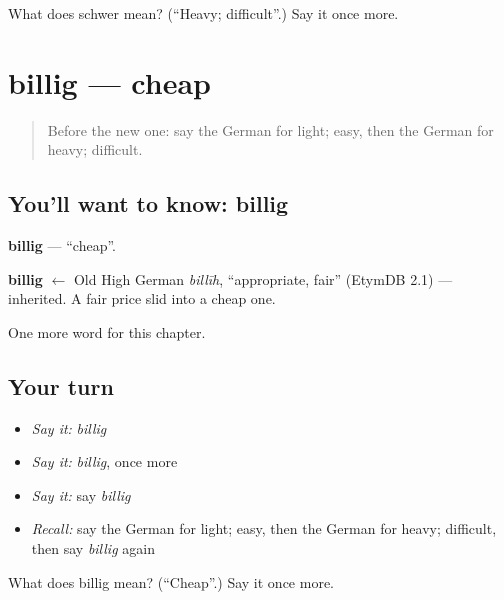 \begin{tcolorbox}[breakable,colback=teal!4,colframe=teal!35!black,title={Before you move on}]
What does schwer mean? (\textquotedblleft{}Heavy; difficult\textquotedblright{}.) Say it once more.
\end{tcolorbox}
\section[billig]{billig — cheap}

\label{lesson:GE-C90-billig}



\begin{quote}
Before the new one: say the German for light; easy, then the German for heavy; difficult.
\end{quote}

\subsection*{You'll want to know: billig}
\textbf{billig} — \textquotedblleft{}cheap\textquotedblright{}.

\begin{cousinweb}
\textbf{billig} $\leftarrow$ Old High German \emph{billīh}, \textquotedblleft{}appropriate, fair\textquotedblright{} (EtymDB 2.1) — inherited. A fair price slid into a cheap one.
\end{cousinweb}

\begin{grammarlens}[title={What you've built}]
One more word for this chapter.
\end{grammarlens}

\subsection*{Your turn}
\begin{itemize}
\raggedright
  \item \emph{Say it:} \emph{billig}
  \item \emph{Say it:} \emph{billig}, once more
  \item \emph{Say it:} say \emph{billig}
  \item \emph{Recall:} say the German for light; easy, then the German for heavy; difficult, then say \emph{billig} again
\end{itemize}

\begin{tcolorbox}[breakable,colback=teal!4,colframe=teal!35!black,title={Before you move on}]
What does billig mean? (\textquotedblleft{}Cheap\textquotedblright{}.) Say it once more.
\end{tcolorbox}
